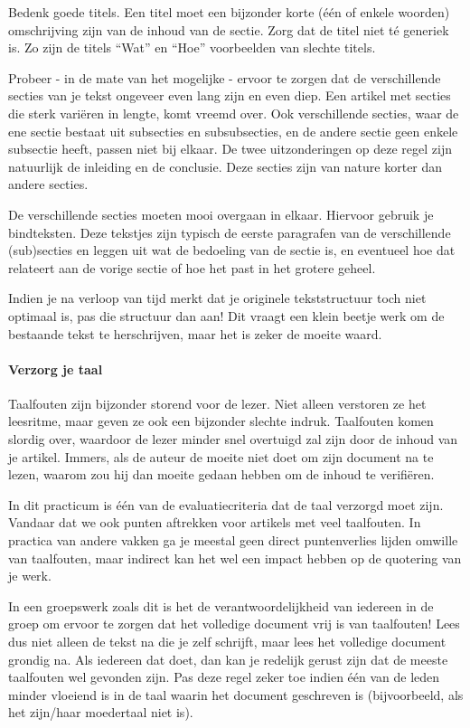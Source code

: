 \documentclass[a4paper]{article}
\begin{document}
Bedenk goede titels.
Een titel moet een bijzonder korte (\'e\'en of enkele woorden) omschrijving zijn van de inhoud van de sectie.
Zorg dat de titel niet t\'e generiek is.
Zo zijn de titels ``Wat'' en ``Hoe'' voorbeelden van slechte titels.

Probeer - in de mate van het mogelijke - ervoor te zorgen dat de verschillende secties van je tekst ongeveer even lang zijn en even diep.
Een artikel met secties die sterk vari\"eren in lengte, komt vreemd over.
Ook verschillende secties, waar de ene sectie bestaat uit subsecties en subsubsecties, en de andere sectie geen enkele subsectie heeft, passen niet bij elkaar.
De twee uitzonderingen op deze regel zijn natuurlijk de inleiding en de conclusie.
Deze secties zijn van nature korter dan andere secties.

De verschillende secties moeten mooi overgaan in elkaar.
Hiervoor gebruik je bindteksten.
Deze tekstjes zijn typisch de eerste paragrafen van de verschillende (sub)secties en leggen uit wat de bedoeling van de sectie is, en eventueel hoe dat relateert aan de vorige sectie of hoe het past in het grotere geheel.

Indien je na verloop van tijd merkt dat je originele tekststructuur toch niet optimaal is, pas die structuur dan aan!
Dit vraagt een klein beetje werk om de bestaande tekst te herschrijven, maar het is zeker de moeite waard.


\paragraph{Verzorg je taal}

Taalfouten zijn bijzonder storend voor de lezer.
Niet alleen verstoren ze het leesritme, maar geven ze ook een bijzonder slechte indruk.
Taalfouten komen slordig over, waardoor de lezer minder snel overtuigd zal zijn door de inhoud van je artikel.
Immers, als de auteur de moeite niet doet om zijn document na te lezen, waarom zou hij dan moeite gedaan hebben om de inhoud te verifi\"eren.

In dit practicum is \'e\'en van de evaluatiecriteria dat de taal verzorgd moet zijn.
Vandaar dat we ook punten aftrekken voor artikels met veel taalfouten.
In practica van andere vakken ga je meestal geen direct puntenverlies lijden omwille van taalfouten, maar indirect kan het wel een impact hebben op de quotering van je werk.

In een groepswerk zoals dit is het de verantwoordelijkheid van iedereen in de groep om ervoor te zorgen dat het volledige document vrij is van taalfouten!
Lees dus niet alleen de tekst na die je zelf schrijft, maar lees het volledige document grondig na.
Als iedereen dat doet, dan kan je redelijk gerust zijn dat de meeste taalfouten wel gevonden zijn.
Pas deze regel zeker toe indien \'e\'en van de leden minder vloeiend is in de taal waarin het document geschreven is (bijvoorbeeld, als het zijn/haar moedertaal niet is).
\end{document}
